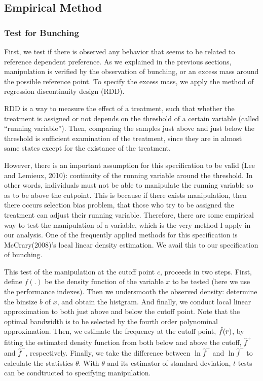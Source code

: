 \documentclass[dvipdfmx, 12pt]{article}
\begin{document}
 \subsection{Empirical Method}

  \subsubsection{Test for Bunching}

  First, we test if there is observed any behavior that seems to be related to reference dependent preference. As we explained in the previous sections, manipulation is verified by the observation of bunching, or an excess mass around the possible reference point. To specify the excess mass, we apply the method of regression discontinuity design (RDD).

  RDD is a way to measure the effect of a treatment, such that whether the treatment is assigned or not depends on the threshold of a certain variable (called ``running variable''). Then, comparing the samples just above and just below the threshold is sufficient examination of the treatment, since they are in almost same states except for the existance of the treatment.

  However, there is an important assumption for this specification to be valid (Lee and Lemieux, 2010): continuity of the running variable around the threshold. In other words, individuals must not be able to manipulate the running variable so as to be above the cutpoint. This is because if there exists manipulation, then there occurs selection bias problem, that those who try to be assigned the treatment can adjust their running variable. Therefore, there are some empirical way to test the manipulation of a variable, which is the very method I apply in our analysis. One of the frequently applied methods for this specification is  McCrary(2008)'s local linear density estimation. We avail this to our specification of bunching.

  This test of the manipulation at the cutoff point $c$, proceeds in two steps. First, define $f(.)$ be the density function of the variable $x$ to be tested (here we use the performance indexes). Then we undersmooth the observed density: determine the binsize $b$ of $x$, and obtain the histgram. And finally, we conduct local linear approximation to both just above and below the cutoff point. Note that the optimal bandwidth is to be selected by the fourth order polynominal approximation. Then, we estimate the frequency at the cutoff point, $\Hat{f}(r)$, by fitting the estimated density function from both below and above the cutoff, $\hat{f}^+$ and $\hat{f}^-$, respectively. Finally, we take the difference between $\ln \hat{f}^+$ and $\ln \hat{f}^-$ to calculate the statistics $\theta$. With $\theta$ and its estimator of standard deviation, $t$-tests can be condtructed to specifying manipulation.
\end{document}
